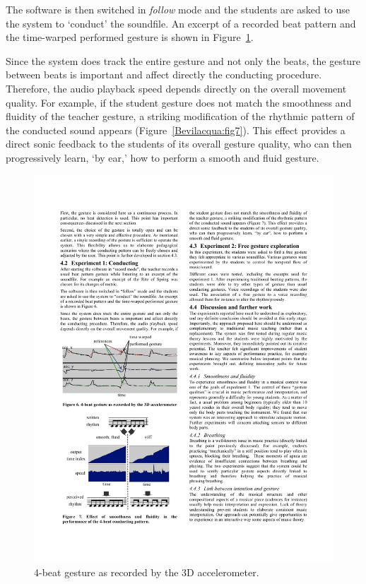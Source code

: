 The software is then switched in \emph{follow} mode and the students are asked to use the system to `conduct' the soundfile. An excerpt of a recorded beat pattern and the time-warped performed gesture is shown in Figure~\ref{Bevilacqua:fig6}. 

Since the system does track the entire gesture and not only the beats, the gesture between beats is important and affect directly the conducting procedure. Therefore, the audio playback speed depends directly on the overall movement quality. For example, if the student gesture does not match the smoothness and fluidity of the teacher gesture, a striking modification of the rhythmic pattern of the conducted sound appears (Figure~\ref{Bevilacqua:fig7}). This effect provides a direct sonic feedback to the students of its overall gesture quality, who can then progressively learn, `by ear,' how to perform a smooth and fluid gesture. 

\begin{figure}[t]
\center
\includegraphics[scale=1.]{fig6.pdf}
%
%
\caption{4-beat gesture as recorded by the 3D accelerometer. }
\label{Bevilacqua:fig6}       %
\end{figure}

